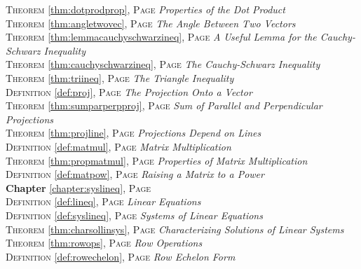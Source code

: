 \begin{multicols}{2}
{\textsc{Theorem} \ref{thm:dotprodprop}, \textsc{Page} \pageref{thm:dotprodprop} \textit{Properties of the Dot Product} \\
\textsc{Theorem} \ref{thm:angletwovec}, \textsc{Page} \pageref{thm:angletwovec} \textit{The Angle Between Two Vectors} \\
\textsc{Theorem} \ref{thm:lemmacauchyschwarzineq}, \textsc{Page} \pageref{thm:lemmacauchyschwarzineq} \textit{A Useful Lemma for the Cauchy-Schwarz Inequality} \\
\textsc{Theorem} \ref{thm:cauchyschwarzineq}, \textsc{Page} \pageref{thm:cauchyschwarzineq} \textit{The Cauchy-Schwarz Inequality} \\
\textsc{Theorem} \ref{thm:triineq}, \textsc{Page} \pageref{thm:triineq} \textit{The Triangle Inequality} \\
\textsc{Definition} \ref{def:proj}, \textsc{Page} \pageref{def:proj} \textit{The Projection Onto a Vector} \\
\textsc{Theorem} \ref{thm:sumparperpproj}, \textsc{Page} \pageref{thm:sumparperpproj} \textit{Sum of Parallel and Perpendicular Projections} \\
\textsc{Theorem} \ref{thm:projline}, \textsc{Page} \pageref{thm:projline} \textit{Projections Depend on Lines} \\
\textsc{Definition} \ref{def:matmul}, \textsc{Page} \pageref{def:matmul} \textit{Matrix Multiplication} \\
\textsc{Theorem} \ref{thm:propmatmul}, \textsc{Page} \pageref{thm:propmatmul} \textit{Properties of Matrix Multiplication} \\
\textsc{Definition} \ref{def:matpow}, \textsc{Page} \pageref{def:matpow} \textit{Raising a Matrix to a Power} \\
\textbf{Chapter} \ref{chapter:syslineq}, \textsc{Page} \pageref{chapter:syslineq} \\
\textsc{Definition} \ref{def:lineq}, \textsc{Page} \pageref{def:lineq} \textit{Linear Equations} \\
\textsc{Definition} \ref{def:syslineq}, \textsc{Page} \pageref{def:syslineq} \textit{Systems of Linear Equations} \\
\textsc{Theorem} \ref{thm:charsollinsys}, \textsc{Page} \pageref{thm:charsollinsys} \textit{Characterizing Solutions of Linear Systems} \\
\textsc{Theorem} \ref{thm:rowops}, \textsc{Page} \pageref{thm:rowops} \textit{Row Operations} \\
\textsc{Definition} \ref{def:rowechelon}, \textsc{Page} \pageref{def:rowechelon} \textit{Row Echelon Form} \\
}
\end{multicols}
